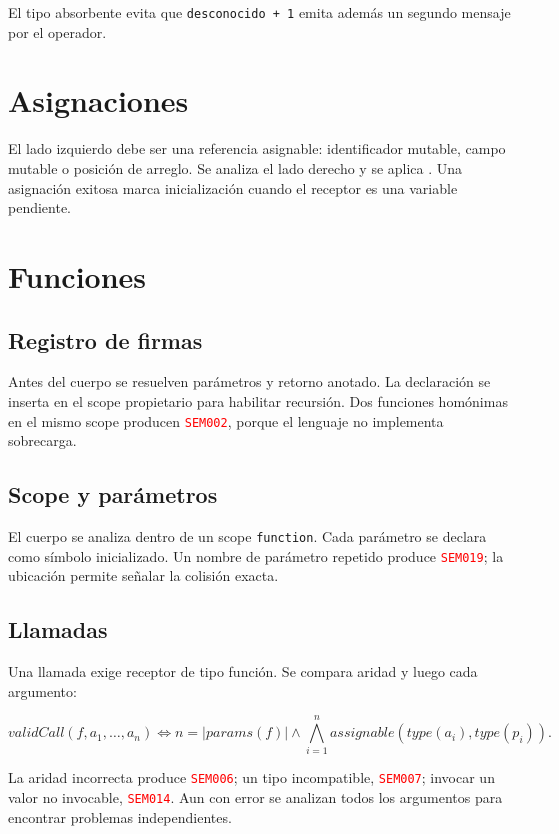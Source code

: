\documentclass[11pt,letterpaper,oneside]{report}
\newcommand{\archivo}[1]{\path{#1}}
\newcommand{\codigo}[1]{\texttt{#1}}
\newcommand{\diag}[1]{\textcolor{red}{\texttt{#1}}}
\begin{document}
El tipo absorbente evita que \codigo{desconocido + 1} emita además un segundo mensaje
por el operador.

\section{Asignaciones}

El lado izquierdo debe ser una referencia asignable: identificador mutable, campo
mutable o posición de arreglo. Se analiza el lado derecho y se aplica
\archivo{isAssignable}. Una asignación exitosa marca inicialización cuando el receptor
es una variable pendiente.

\section{Funciones}

\subsection{Registro de firmas}

Antes del cuerpo se resuelven parámetros y retorno anotado. La declaración se inserta
en el scope propietario para habilitar recursión. Dos funciones homónimas en el mismo
scope producen \diag{SEM002}, porque el lenguaje no implementa sobrecarga.

\subsection{Scope y parámetros}

El cuerpo se analiza dentro de un scope \codigo{function}. Cada parámetro se declara
como símbolo inicializado. Un nombre de parámetro repetido produce \diag{SEM019}; la
ubicación permite señalar la colisión exacta.

\subsection{Llamadas}

Una llamada exige receptor de tipo función. Se compara aridad y luego cada argumento:

\[
validCall(f,a_1,\ldots,a_n)\iff
n=|params(f)|\land
\bigwedge_{i=1}^{n} assignable(type(a_i),type(p_i)).
\]

La aridad incorrecta produce \diag{SEM006}; un tipo incompatible,
\diag{SEM007}; invocar un valor no invocable, \diag{SEM014}. Aun con error se analizan
todos los argumentos para encontrar problemas independientes.
\end{document}
